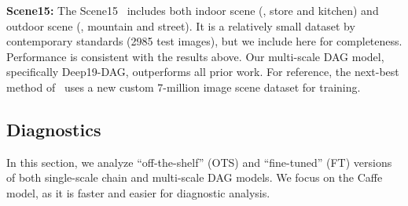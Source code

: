\documentclass[10pt,twocolumn,letterpaper]{article}
\begin{document}



{\bf Scene15:} The Scene15~\cite{Scene15} includes both indoor scene (\eg, store and kitchen) and outdoor scene (\eg, mountain and street). It is a relatively small dataset by contemporary standards (2985 test images), but we include here for completeness. Performance is consistent with the results above. Our multi-scale DAG model, specifically Deep19-DAG, outperforms all prior work. For reference, the next-best method of~\cite{zhoulearning} uses a new custom 7-million image scene dataset for training.



\subsection{Diagnostics \label{sec:diag}}
In this section, we analyze ``off-the-shelf'' (OTS) and ``fine-tuned'' (FT) versions of both single-scale chain and multi-scale DAG models. We focus on the Caffe model, as it is faster and easier for diagnostic analysis. 
\end{document}
